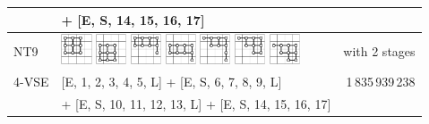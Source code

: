 \documentclass[runningheads]{llncs}
\begin{document}
\begin{tabular}{p{1.2cm}l@{~~}r}
      & + [E, S, 14, 15, 16, 17]                                      & \\\hline
\textsf{NT9}
&
\includegraphics[width=0.9cm]{figures/NTuple-90.pdf}
\includegraphics[width=0.9cm]{figures/NTuple-91.pdf}
\includegraphics[width=0.9cm]{figures/NTuple-92.pdf}
\includegraphics[width=0.9cm]{figures/NTuple-93.pdf}
\includegraphics[width=0.9cm]{figures/NTuple-94.pdf}
\includegraphics[width=0.9cm]{figures/NTuple-95.pdf}
\includegraphics[width=0.9cm]{figures/NTuple-96.pdf}
& with 2 stages\\
4-VSE & [E, 1, 2, 3, 4, 5, L] + [E, S, 6, 7, 8, 9, L]        &  1\,835\,939\,238 \\
      & + [E, S, 10, 11, 12, 13, L] + [E, S, 14, 15, 16, 17] &                   \\\hline
\end{tabular}
\end{document}
